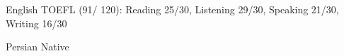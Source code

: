 
\begin{cvskills}
  \cvskill
  {English}
  {TOEFL (91/ 120): Reading 25/30, Listening 29/30, Speaking 21/30, Writing 16/30}

  \cvskill
  {Persian}
  {Native}
\end{cvskills}
